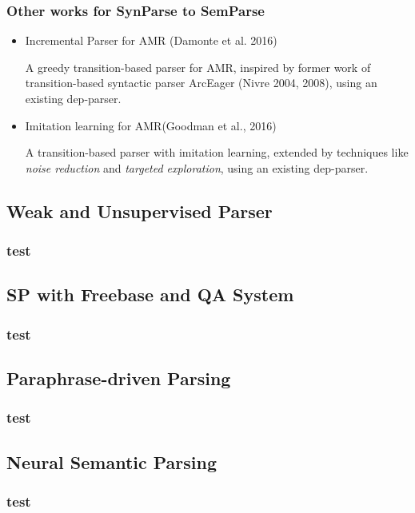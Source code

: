 \documentclass{beamer}
\begin{document}
\begin{frame}
    \frametitle{Other works for SynParse to SemParse}

    \begin{itemize}
        \item Incremental Parser for AMR (Damonte et al. 2016)

            A greedy transition-based parser for AMR, inspired by former work of
            transition-based syntactic parser ArcEager (Nivre 2004, 2008),
            using an existing dep-parser.

        \item Imitation learning for AMR(Goodman et al., 2016)

            A transition-based parser with imitation learning, extended by techniques
            like \emph{noise reduction} and \emph{targeted exploration},
            using an existing dep-parser.

    \end{itemize}
\end{frame}

\subsection{Weak and Unsupervised Parser}
\begin{frame}
    \frametitle{test}
\end{frame}

\subsection{SP with Freebase and QA System}

\begin{frame}
    \frametitle{test}
\end{frame}

\subsection{Paraphrase-driven Parsing}

\begin{frame}
    \frametitle{test}
\end{frame}

\subsection{Neural Semantic Parsing}
\begin{frame}
    \frametitle{test}
\end{frame}
\end{document}
